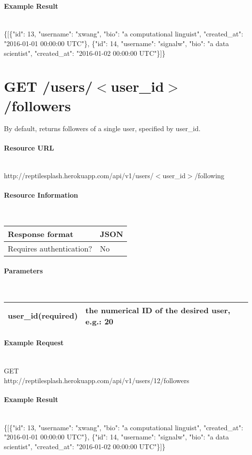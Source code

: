 \documentclass{article}
\begin{document}
	\paragraph{Example Result} \mbox{} \\
	\{[\{"id": 13, "username": "xwang", "bio": "a computational linguist", "created\_at": "2016-01-01 00:00:00 UTC"\}, \{"id": 14, "username": "signalw", "bio": "a data scientist", "created\_at": "2016-01-02 00:00:00 UTC"\}]\}
	
	
	\section*{GET /users/$<$user\_id$>$/followers}
	By default, returns followers of a single user, specified by user\_id. 
	\paragraph{Resource URL} \mbox{} \\
	http://reptilesplash.herokuapp.com/api/v1/users/$<$user\_id$>$/following
	\paragraph{Resource Information} \mbox{} \\
	\begin{tabular}{ll}
		\hline
		Response format & JSON \\ \hline
		Requires authentication? & No \\ \hline
	\end{tabular}
	\paragraph{Parameters} \mbox{} \\
	\begin{tabular}{ll}
		\hline
		user\_id(required) & the numerical ID of the desired user, e.g.: 20 \\ \hline
	\end{tabular}
	\paragraph{Example Request} \mbox{} \\
	GET \\
	http://reptilesplash.herokuapp.com/api/v1/users/12/followers 
	\paragraph{Example Result} \mbox{} \\
	\{[\{"id": 13, "username": "xwang", "bio": "a computational linguist", "created\_at": "2016-01-01 00:00:00 UTC"\}, \{"id": 14, "username": "signalw", "bio": "a data scientist", "created\_at": "2016-01-02 00:00:00 UTC"\}]\}
	
\end{document}
